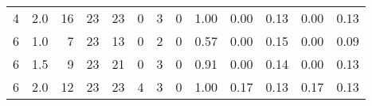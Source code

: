 \begin{tabular}{rrrrrrrrrrrrr}
                     4 &                        2.0 &                                 16 &                       23 &                      23 &                            0 &                         3 &                        0 &                          1.00 &                                0.00 &                                 0.13 &                            0.00 &                             0.13 \\
                     6 &                        1.0 &                                  7 &                       23 &                      13 &                            0 &                         2 &                        0 &                          0.57 &                                0.00 &                                 0.15 &                            0.00 &                             0.09 \\
                     6 &                        1.5 &                                  9 &                       23 &                      21 &                            0 &                         3 &                        0 &                          0.91 &                                0.00 &                                 0.14 &                            0.00 &                             0.13 \\
                     6 &                        2.0 &                                 12 &                       23 &                      23 &                            4 &                         3 &                        0 &                          1.00 &                                0.17 &                                 0.13 &                            0.17 &                             0.13 \\
\bottomrule
\end{tabular}
